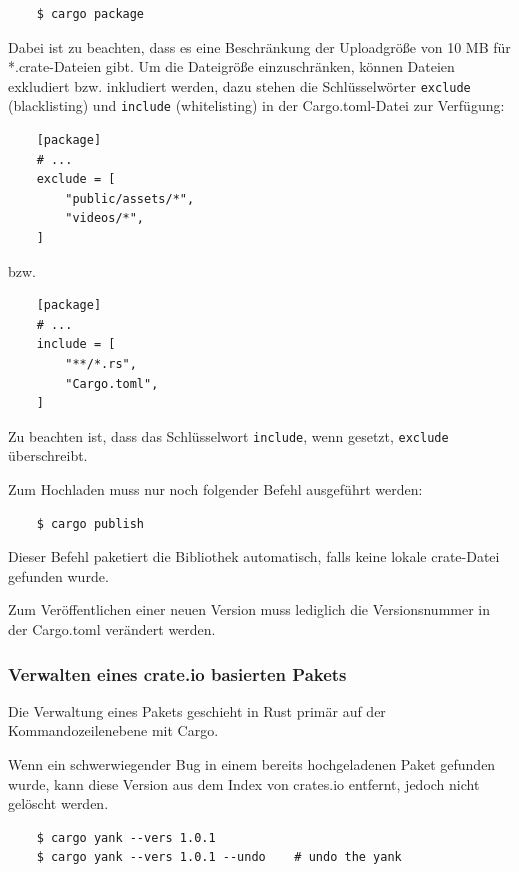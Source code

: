 \begin{lstlisting}
    $ cargo package
\end{lstlisting}

Dabei ist zu beachten, dass es eine Beschränkung der Uploadgröße von 10 MB für *.crate-Dateien gibt. Um die Dateigröße einzuschränken, können Dateien exkludiert bzw. inkludiert werden, dazu stehen die Schlüsselwörter \verb"exclude" (blacklisting) und \verb"include" (whitelisting) in der Cargo.toml-Datei zur Verfügung:

\begin{lstlisting}
    [package]
    # ...
    exclude = [
        "public/assets/*",
        "videos/*",
    ]
\end{lstlisting}

bzw.

\begin{lstlisting}
    [package]
    # ...
    include = [
        "**/*.rs",
        "Cargo.toml",
    ]
\end{lstlisting}

Zu beachten ist, dass das Schlüsselwort \verb"include", wenn gesetzt, \verb"exclude" überschreibt.

Zum Hochladen muss nur noch folgender Befehl ausgeführt werden:

\begin{lstlisting}
    $ cargo publish
\end{lstlisting}

Dieser Befehl paketiert die Bibliothek automatisch, falls keine lokale crate-Datei gefunden wurde.

Zum Veröffentlichen einer neuen Version muss lediglich die Versionsnummer in der Cargo.toml verändert werden.

\subsubsection{Verwalten eines crate.io basierten Pakets}

Die Verwaltung eines Pakets geschieht in Rust primär auf der Kommandozeilenebene mit Cargo.

Wenn ein schwerwiegender Bug in einem bereits hochgeladenen Paket gefunden wurde, kann diese Version aus dem Index von crates.io entfernt, jedoch nicht gelöscht werden.

\begin{lstlisting}
    $ cargo yank --vers 1.0.1
    $ cargo yank --vers 1.0.1 --undo    # undo the yank
\end{lstlisting}

